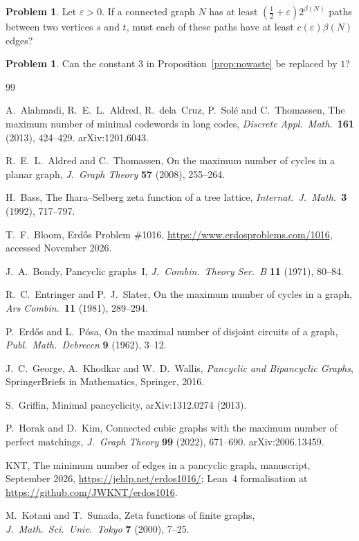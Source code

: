 \documentclass[11pt]{article}
\theoremstyle{definition}
\newtheorem{problem}[theorem]{Problem}
\theoremstyle{remark}
\newcommand{\half}{\tfrac12}
\begin{document}
\begin{problem}
Let $\varepsilon>0$. If a connected graph $N$ has at least $(\half+\varepsilon)2^{\beta(N)}$ paths
between two vertices $s$ and $t$, must each of these paths have at least $c(\varepsilon)\beta(N)$
edges?
\end{problem}

\begin{problem}
Can the constant $3$ in Proposition~\ref{prop:nowaste} be replaced by $1$?
\end{problem}

\begin{thebibliography}{99}\small

 A.~Alahmadi, R.~E.~L.~Aldred, R.~dela~Cruz, P.~Sol\'e and C.~Thomassen, The maximum
number of minimal codewords in long codes, \emph{Discrete Appl.\ Math.}\ \textbf{161} (2013),
424--429. arXiv:1201.6043.

 R.~E.~L.~Aldred and C.~Thomassen, On the maximum number of cycles in a planar graph,
\emph{J.~Graph Theory} \textbf{57} (2008), 255--264.

 H.~Bass, The Ihara--Selberg zeta function of a tree lattice, \emph{Internat.\
J.~Math.}\ \textbf{3} (1992), 717--797.

 T.~F.~Bloom, Erd\H{o}s Problem \#1016, \url{https://www.erdosproblems.com/1016},
accessed November 2026.

 J.~A.~Bondy, Pancyclic graphs~I, \emph{J.~Combin.\ Theory Ser.~B} \textbf{11}
(1971), 80--84.

 R.~C.~Entringer and P.~J.~Slater, On the maximum number of cycles in a graph,
\emph{Ars Combin.}\ \textbf{11} (1981), 289--294.

 P.~Erd\H{o}s and L.~P\'osa, On the maximal number of disjoint circuits of a graph,
\emph{Publ.\ Math.\ Debrecen} \textbf{9} (1962), 3--12.

 J.~C.~George, A.~Khodkar and W.~D.~Wallis, \emph{Pancyclic and Bipancyclic Graphs},
SpringerBriefs in Mathematics, Springer, 2016.

 S.~Griffin, Minimal pancyclicity, arXiv:1312.0274 (2013).

 P.~Horak and D.~Kim, Connected cubic graphs with the maximum number of perfect
matchings, \emph{J.~Graph Theory} \textbf{99} (2022), 671--690. arXiv:2006.13459.

 KNT, The minimum number of edges in a pancyclic graph, manuscript, September 2026,
\url{https://jehlp.net/erdos1016/}; Lean~4 formalisation at
\url{https://github.com/JWKNT/erdos1016}.

 M.~Kotani and T.~Sunada, Zeta functions of finite graphs, \emph{J.~Math.\ Sci.\ Univ.\
Tokyo} \textbf{7} (2000), 7--25.

\end{thebibliography}
\end{document}
